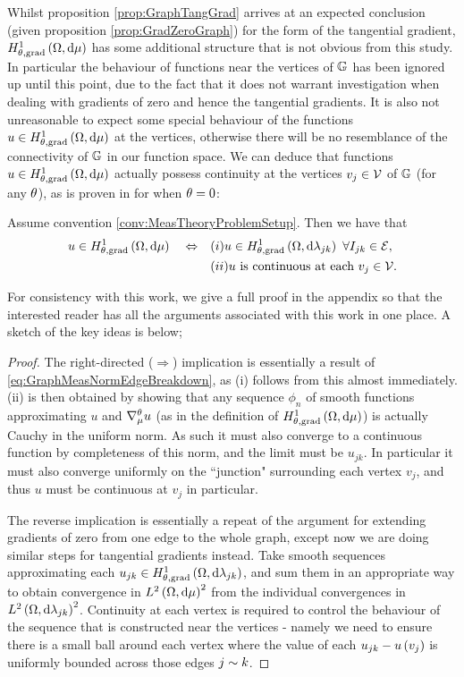 Whilst proposition \ref{prop:GraphTangGrad} arrives at an expected conclusion (given proposition \ref{prop:GradZeroGraph}) for the form of the tangential gradient, $H^1_{\theta, \mathrm{grad}}\left( \Omega, \mathrm{d}\mu \right)$ has some additional structure that is not obvious from this study.
In particular the behaviour of functions near the vertices of $\mathbb{G}$ has been ignored up until this point, due to the fact that it does not warrant investigation when dealing with gradients of zero and hence the tangential gradients.
It is also not unreasonable to expect some special behaviour of the functions $u\in H^1_{\theta, \mathrm{grad}}\left( \Omega, \mathrm{d}\mu \right)$ at the vertices, otherwise there will be no resemblance of the connectivity of $\mathbb{G}$ in our function space.
We can deduce that functions $u\in H^1_{\theta, \mathrm{grad}}\left( \Omega, \mathrm{d}\mu \right)$ actually possess continuity at the vertices $v_j\in \mathcal{V}$ of $\mathbb{G}$ (for any $\theta$), as is proven in  for when $\theta=0$:
\begin{theorem} \label{thm:CharOfGradSob}
	Assume convention \ref{conv:MeasTheoryProblemSetup}.
	Then we have that
	\begin{align*}
		u\in H^1_{\theta, \mathrm{grad}}\left( \Omega, \mathrm{d}\mu \right) \quad\Leftrightarrow\quad 
		& (i) u\in H^1_{\theta, \mathrm{grad}}\left( \Omega, \mathrm{d}\lambda_{jk} \right) \ \forall I_{jk}\in \mathcal{E}, \\
		& (ii) u \text{ is continuous at each } v_j\in \mathcal{V}.
	\end{align*}
\end{theorem}
For consistency with this work, we give a full proof in the appendix so that the interested reader has all the arguments associated with this work in one place.
A sketch of the key ideas is below;
\begin{proof}
	The right-directed ($\Rightarrow$) implication is essentially a result of \eqref{eq:GraphMeasNormEdgeBreakdown}, as (i) follows from this almost immediately.
	(ii) is then obtained by showing that any sequence $\phi_n$ of smooth functions approximating $u$ and $\nabla^{\theta}_\mu u$ (as in the definition of $H^1_{\theta, \mathrm{grad}}\left( \Omega, \mathrm{d}\mu \right)$) is actually Cauchy in the uniform norm.
	As such it must also converge to a continuous function by completeness of this norm, and the limit must be $u_{jk}$.
	In particular it must also converge uniformly on the ``junction" surrounding each vertex $v_j$, and thus $u$ must be continuous at $v_j$ in particular. \newline
	
	The reverse implication is essentially a repeat of the argument for extending gradients of zero from one edge to the whole graph, except now we are doing similar steps for tangential gradients instead.
	Take smooth sequences approximating each $u_{jk}\in H^1_{\theta, \mathrm{grad}}\left( \Omega, \mathrm{d}\lambda_{jk} \right)$, and sum them in an appropriate way to obtain convergence in $L^{2}\left( \Omega,\mathrm{d}\mu \right)^2$ from the individual convergences in $L^{2}\left( \Omega,\mathrm{d}\lambda_{jk} \right)^2$.
	Continuity at each vertex is required to control the behaviour of the sequence that is constructed near the vertices - namely we need to ensure there is a small ball around each vertex where the value of each $u_{jk} - u\left( v_j \right)$ is uniformly bounded across those edges $j\sim k$.
\end{proof}

